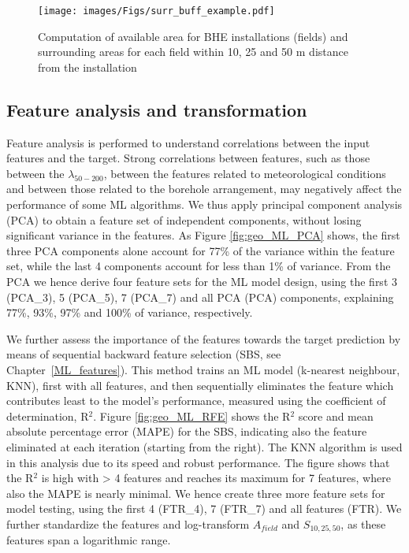 \begin{figure}[tb]
\centering\texttt{[image: images/Figs/surr\_buff\_example.pdf]}
\caption{Computation of available area for BHE installations (fields) and surrounding areas for each field within 10, 25 and 50 m distance from the installation}
\label{fig:surr_fields}
\end{figure}

\subsection{Feature analysis and transformation}
\label{geo_ML_ftrs}

Feature analysis is performed to understand correlations between the input features and the target. Strong correlations between features, such as those between the $\lambda_{50-200}$, between the features related to meteorological conditions and between those related to the borehole arrangement, may negatively affect the performance of some ML algorithms. We thus apply principal component analysis (PCA) to obtain a feature set of independent components, without losing significant variance in the features. As Figure \ref{fig:geo_ML_PCA} shows, the first three PCA components alone account for 77\% of the variance within the feature set, while the last 4 components account for less than 1\% of variance. From the PCA we hence derive four feature sets for the ML model design, using the first 3 (PCA\_3), 5 (PCA\_5), 7 (PCA\_7) and all PCA (PCA) components, explaining 77\%, 93\%, 97\% and 100\% of variance, respectively.

We further assess the importance of the features towards the target prediction by means of sequential backward feature selection (SBS, see Chapter~\ref{ML_features}). 
This method trains an ML model (k-nearest neighbour, KNN), first with all features, and then sequentially eliminates the feature which contributes least to the model’s performance, measured using the coefficient of determination, R$^2$. 
Figure \ref{fig:geo_ML_RFE} shows the R$^2$ score and mean absolute percentage error (MAPE) for the SBS, indicating also the feature eliminated at each iteration (starting from the right). The KNN algorithm is used in this analysis due to its speed and robust performance. The figure shows that the R$^2$ is high with > 4 features and reaches its maximum for 7 features, where also the MAPE is nearly minimal. We hence create three more feature sets for model testing, using the first 4 (FTR\_4), 7 (FTR\_7) and all features (FTR). We further standardize the features and log-transform $A_{field}$ and $S_{10,25,50}$, as these features span a logarithmic range.

